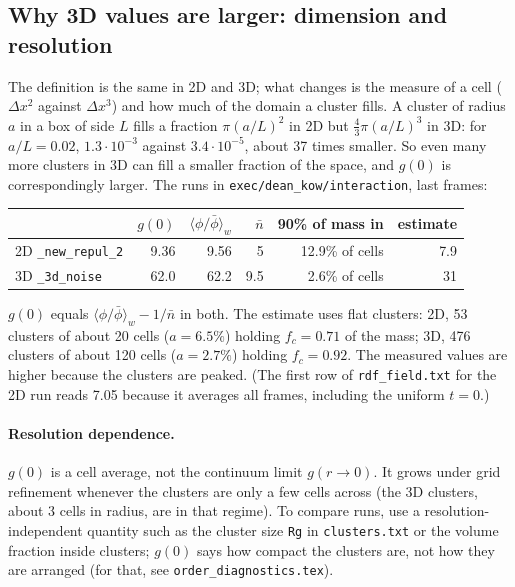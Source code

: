 \documentclass[11pt]{article}
\newcommand{\code}[1]{\texttt{#1}}
\newcommand{\nb}{\bar n}
\begin{document}
\subsection{Why 3D values are larger: dimension and resolution}
The definition is the same in 2D and 3D; what changes is the measure of a cell
($\Delta x^2$ against $\Delta x^3$) and how much of the domain a cluster fills.
A cluster of radius $a$ in a box of side $L$ fills a fraction $\pi(a/L)^2$ in
2D but $\frac43\pi(a/L)^3$ in 3D: for $a/L=0.02$, $1.3\cdot10^{-3}$ against
$3.4\cdot10^{-5}$, about 37 times smaller. So even many more clusters in 3D can
fill a smaller fraction of the space, and $g(0)$ is correspondingly larger. The
runs in \code{exec/dean\_kow/interaction}, last frames:
\begin{center}
\begin{tabular}{@{}l r r r r r@{}}
\toprule
 & $g(0)$ & $\langle\phi/\bar\phi\rangle_w$ & $\nb$ & 90\% of mass in & estimate \\
\midrule
2D \code{\_new\_repul\_2} & 9.36 & 9.56 & 5 & 12.9\% of cells & 7.9 \\
3D \code{\_3d\_noise} & 62.0 & 62.2 & 9.5 & 2.6\% of cells & 31 \\
\bottomrule
\end{tabular}
\end{center}
$g(0)$ equals $\langle\phi/\bar\phi\rangle_w-1/\nb$ in both. The estimate uses
flat clusters: 2D, 53 clusters of about 20 cells ($a=6.5\%$) holding
$f_c=0.71$ of the mass; 3D, 476 clusters of about 120 cells ($a=2.7\%$) holding
$f_c=0.92$. The measured values are higher because the clusters are peaked.
(The first row of \code{rdf\_field.txt} for the 2D run reads 7.05 because it
averages all frames, including the uniform $t=0$.)

\paragraph{Resolution dependence.} $g(0)$ is a cell average, not the continuum
limit $g(r\to0)$. It grows under grid refinement whenever the clusters are
only a few cells across (the 3D clusters, about 3 cells in radius, are in that
regime). To compare runs, use a resolution-independent quantity such as the
cluster size \code{Rg} in \code{clusters.txt} or the volume fraction inside
clusters; $g(0)$ says how compact the clusters are, not how they are arranged
(for that, see \code{order\_diagnostics.tex}).
\end{document}
